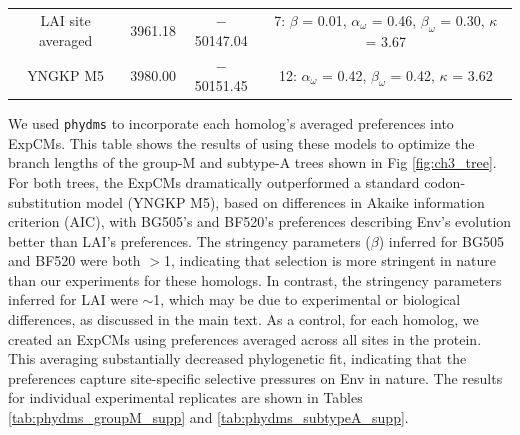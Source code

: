 \documentclass[9pt,lineno]{elife}
\begin{document}
\begin{table}
{\begin{tabular}{cccc}
LAI site averaged & 3961.18 & $-$50147.04 & 7: $\beta$ = 0.01, $\alpha_\omega$ = 0.46, $\beta_\omega$ = 0.30, $\kappa$ = 3.67\\
YNGKP M5 & 3980.00 & $-$50151.45 & 12: $\alpha_\omega$ = 0.42, $\beta_\omega$ = 0.42, $\kappa$ = 3.62
\end{tabular}
}
\begin{flushleft}
We used \texttt{phydms} to incorporate each homolog's averaged preferences into ExpCMs.
This table shows the results of using these models to optimize the branch lengths of the group-M and subtype-A trees shown in Fig \ref{fig:ch3_tree}.
For both trees, the ExpCMs dramatically outperformed a standard codon-substitution model (YNGKP M5), based on differences in Akaike information criterion (AIC), with BG505's and BF520's preferences describing Env's evolution better than LAI's preferences. 
The stringency parameters ($\beta$) inferred for BG505 and BF520 were both  $>$1, indicating that selection is more stringent in nature than our experiments for these homologs.
In contrast, the stringency parameters inferred for LAI were $\sim$1, which may be due to experimental or biological differences, as discussed in the main text.
As a control, for each homolog, we created an ExpCMs using preferences averaged across all sites in the protein.
This averaging substantially decreased phylogenetic fit, indicating that the preferences capture site-specific selective pressures on Env in nature.
The results for individual experimental replicates are shown in Tables \ref{tab:phydms_groupM_supp} and \ref{tab:phydms_subtypeA_supp}.
\end{flushleft}
\label{tab:phydms}
\end{table}
\end{document}
